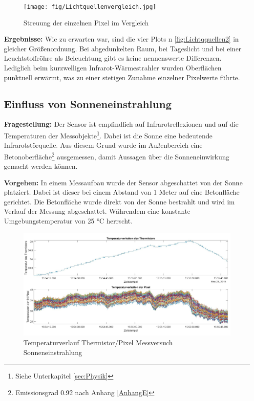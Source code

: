\begin{figure}[H]
	\centering
	\texttt{[image: fig/Lichtquellenvergleich.jpg]}
	\caption[Streuung der einzelnen Pixel im Vergleich]{Streuung der einzelnen Pixel im Vergleich}
	\label{fig:Lichtquellen2}
\end{figure}

\textbf{Ergebnisse:}  Wie zu erwarten war, sind die vier Plots n \ref{fig:Lichtqquellen2} in gleicher Größenordnung. Bei abgedunkelten Raum, bei Tageslicht und bei einer Leuchtstoffröhre als Beleuchtung gibt es keine nennenswerte Differenzen. Lediglich beim kurzwelligen Infrarot-Wärmestrahler wurden Oberflächen punktuell erwärmt, was zu einer stetigen Zunahme einzelner Pixelwerte führte. 
\newpage
\subsection{Einfluss von  Sonneneinstrahlung}

\textbf{Fragestellung:} Der Sensor ist empfindlich auf Infrarotreflexionen und auf die Temperaturen der Messobjekte\footnote[19]{Siehe Unterkapitel  \ref{sec:Physik}}. Dabei ist die Sonne eine bedeutende Infrarotstörquelle. Aus diesem Grund wurde im Außenbereich eine Betonoberfläche\footnote[20]{Emissionsgrad 0.92 nach Anhang \ref{AnhangE}} ausgemessen, damit Aussagen über die Sonneneinwirkung gemacht werden können. 

\textbf{Vorgehen:} In einem Messaufbau wurde der Sensor abgeschattet von der Sonne platziert. Dabei ist dieser bei einem Abstand von 1 Meter auf eine Betonfläche gerichtet. Die Betonfläche wurde direkt von der Sonne bestrahlt und wird im Verlauf der Messung abgeschattet. Währendem eine konstante Umgebungstemperatur von 25 °C herrscht.  


\begin{figure}[H]
	\centering
	\includegraphics[width=1.0\textwidth]{fig/Temperaturverhalten2}
	\caption[Temperaturverlauf Thermistor/Pixel Messversuch Sonneneinstrahlung]{Temperaturverlauf Thermistor/Pixel Messversuch Sonneneinstrahlung}
	\label{fig:temperaturverhalten2}
\end{figure}

